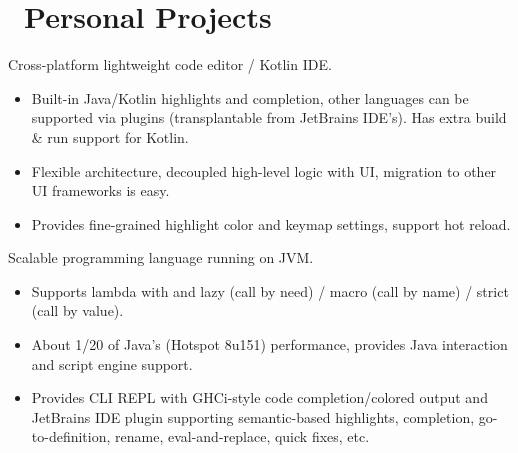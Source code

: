 \documentclass{resume}
\begin{document}
\section{\faGithubAlt\ Personal Projects}
Cross-platform lightweight code editor / Kotlin IDE.
\begin{itemize}
  \item Built-in Java/Kotlin highlights and completion, other languages can be supported
    via plugins (transplantable from JetBrains IDE's).
    Has extra build \& run support for Kotlin.
  \item Flexible architecture, decoupled high-level logic with UI, migration to other UI frameworks is easy.
  \item Provides fine-grained highlight color and keymap settings, support hot reload.
\end{itemize}

Scalable programming language running on JVM.
\begin{itemize}
  \item Supports lambda with and lazy (call by need) / macro (call by name) / strict (call by value).
  \item About 1/20 of Java's (Hotspot 8u151) performance, provides Java interaction and script engine support.
  \item Provides CLI REPL with GHCi-style code completion/colored output and JetBrains
    IDE plugin supporting semantic-based highlights, completion, go-to-definition, rename, eval-and-replace, quick fixes, etc.
\end{itemize}
\end{document}

